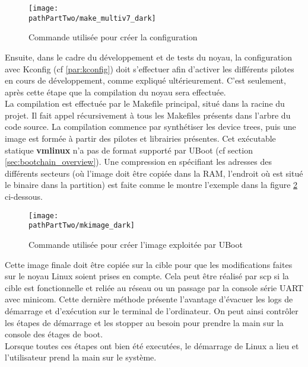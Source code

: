\begin{figure}[H]
	\begin{center}
		\texttt{[image: \\pathPartTwo/make\_multiv7\_dark]}
		\caption{Commande utilisée pour créer la configuration}
	    \label{fig:make_multiv7}
	\end{center}
\end{figure}

Ensuite, dans le cadre du développement et de tests du noyau, la configuration
avec Kconfig (cf \ref{par:kconfig}) doit s'effectuer afin d'activer les
différents pilotes en cours de développement, comme expliqué ultérieurement.
C'est seulement, après cette étape que la compilation du noyau sera effectuée.
\\

La compilation est effectuée par le Makefile principal, situé dans la racine
du projet. Il fait appel récursivement à tous les Makefiles présents dans
l'arbre du code source. La compilation commence par synthétiser les device
trees, puis une image est formée à partir des pilotes et librairies présentes.
Cet exécutable statique \textbf{vmlinux} n'a pas de format supporté par UBoot
(cf section \ref{sec:bootchain_overview}). Une compression en spécifiant les
adresses des différents secteurs (où l'image doit être copiée dans la RAM,
l'endroit où est situé le binaire dans la partition) est faite comme le montre
l'exemple dans la figure \ref{fig:mkimage} ci-dessous. \\ 

\begin{figure}[H]
	\begin{center}
		\texttt{[image: \\pathPartTwo/mkimage\_dark]}
		\caption{Commande utilisée pour créer l'image exploitée par UBoot}
	    \label{fig:mkimage}
	\end{center}
\end{figure}

Cette image finale doit être copiée sur la cible pour que les modifications
faites sur le noyau Linux soient prises en compte. Cela peut être réalisé par
scp si la cible est fonctionnelle et reliée au réseau ou un passage par la
console série UART avec minicom. Cette dernière méthode présente l'avantage
d'évacuer les logs de démarrage et d'exécution sur le terminal de
l'ordinateur. On peut ainsi contrôler les étapes de démarrage et les stopper
au besoin pour prendre la main sur la console des étages de boot. \\

Lorsque toutes ces étapes ont bien été executées, le démarrage de Linux a lieu
et l'utilisateur prend la main sur le système.

